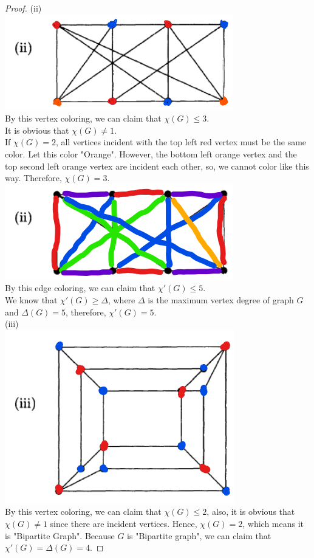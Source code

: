 \documentclass[a4paper, 12pt]{article}
\begin{document}
\begin{proof}
(ii) \\
\includegraphics[width=0.5\linewidth]{image4.png} \\
By this vertex coloring, we can claim that $\chi (G) \leq 3$. \\
It is obvious that $\chi (G) \neq 1$. \\ 
If $\chi (G) = 2$, all vertices incident with the top left red vertex must be the same color. Let this color "Orange". However, the bottom left orange vertex and the top second left orange vertex are incident each other, so, we cannot color like this way. Therefore, $\chi (G) = 3$. \\
\includegraphics[width=0.5\linewidth]{image5.png} \\
By this edge coloring, we can claim that $\chi '(G) \leq 5$. \\
We know that $\chi '(G) \geq \Delta$, where $\Delta$ is the maximum vertex degree of graph $G$ and $\Delta (G) = 5$, therefore, $\chi '(G) = 5$. \\

(iii) \\
\includegraphics[width=0.5\linewidth]{image6.png} \\
By this vertex coloring, we can claim that $\chi (G) \leq 2$, also, it is obvious that $\chi (G) \neq 1$ since there are incident vertices. Hence, $\chi (G) = 2$, which means it is "Bipartite Graph". Because $G$ is "Bipartite graph", we can claim that $\chi '(G) = \Delta (G) = 4$.
\end{proof}
\end{document}
